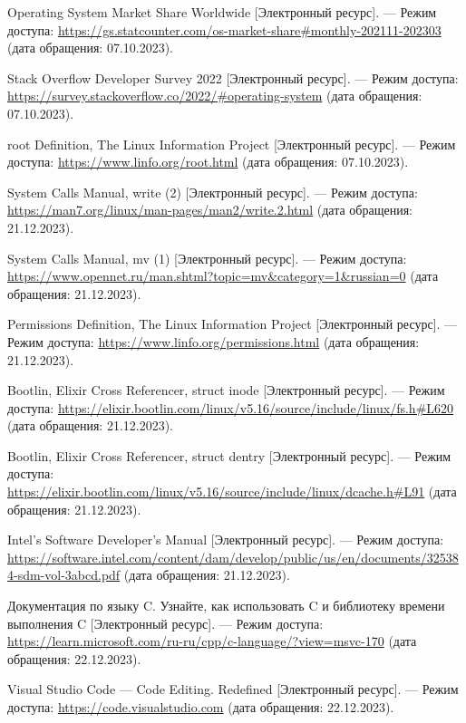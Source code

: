 \begin{thebibliography}{}
	Operating System Market Share Worldwide [Электронный ресурс]. --- Режим доступа: \url{https://gs.statcounter.com/os-market-share#monthly-202111-202303} (дата обращения: 07.10.2023).
	
	Stack Overflow Developer Survey 2022 [Электронный ресурс]. --- Режим доступа: \url{https://survey.stackoverflow.co/2022/#operating-system} (дата обращения: 07.10.2023).

	root Definition, The Linux Information Project [Электронный ресурс]. --- Режим доступа: \url{https://www.linfo.org/root.html} (дата обращения: 07.10.2023).
	
	System Calls Manual, write (2) [Электронный ресурс]. --- Режим доступа: \url{https://man7.org/linux/man-pages/man2/write.2.html} (дата обращения: 21.12.2023).

	System Calls Manual, mv (1) [Электронный ресурс]. --- Режим доступа: \url{https://www.opennet.ru/man.shtml?topic=mv&category=1&russian=0} (дата обращения: 21.12.2023).

	Permissions Definition, The Linux Information Project [Электронный ресурс]. --- Режим доступа: \url{https://www.linfo.org/permissions.html} (дата обращения: 21.12.2023).

	Bootlin, Elixir Cross Referencer, struct inode [Электронный ресурс]. --- Режим доступа: \url{https://elixir.bootlin.com/linux/v5.16/source/include/linux/fs.h#L620} (дата обращения: 21.12.2023).

	Bootlin, Elixir Cross Referencer, struct dentry [Электронный ресурс]. --- Режим доступа: \url{https://elixir.bootlin.com/linux/v5.16/source/include/linux/dcache.h#L91} (дата обращения: 21.12.2023).

	Intel's Software Developer's Manual [Электронный ресурс]. --- Режим доступа: \url{https://software.intel.com/content/dam/develop/public/us/en/documents/325384-sdm-vol-3abcd.pdf} (дата обращения: 21.12.2023).

	Документация по языку C. Узнайте, как использовать C и библиотеку времени выполнения C [Электронный ресурс]. --- Режим доступа: \url{https://learn.microsoft.com/ru-ru/cpp/c-language/?view=msvc-170} (дата обращения: 22.12.2023).

	Visual Studio Code --- Code Editing. Redefined [Электронный ресурс]. --- Режим доступа: \url{https://code.visualstudio.com} (дата обращения: 22.12.2023).
	

\end{thebibliography}

